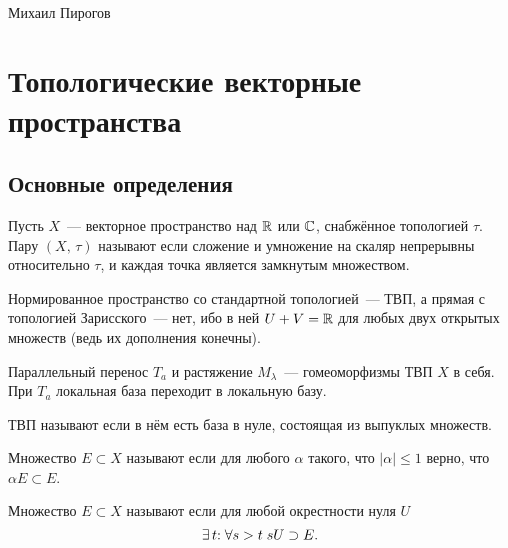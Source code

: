 \documentclass{notes}
\begin{document}
	\begin{center}
		\huge{} \\
		\vspace{0.5em}
		\large{Михаил Пирогов}
	\end{center}
	\vspace{0.5em}

\section{Топологические векторные пространства}

\subsection{Основные определения}

	\begin{de}
		Пусть $X$~--- векторное пространство над $\mathbb{R}$ или $\mathbb{C}$, снабжённое топологией $\tau$. Пару $(X, \, \tau)$ называют  если сложение и умножение на скаляр непрерывны относительно $\tau$, и каждая точка является замкнутым множеством.
	\end{de}

	\begin{exm}
		Нормированное пространство со стандартной топологией~--- ТВП, а прямая с топологией Зарисского~--- нет, ибо в ней $U + V = \mathbb{R}$ для любых двух открытых множеств (ведь их дополнения конечны).
	\end{exm}

	\begin{st}
		Параллельный перенос $T_a$ и растяжение $M_{\lambda}$~--- гомеоморфизмы ТВП $X$ в себя. При $T_a$ локальная база переходит в локальную базу.
	\end{st}

	\begin{de}
		ТВП называют  если в нём есть база в нуле, состоящая из выпуклых множеств.
	\end{de}

	\begin{de}
		Множество $E \subset X$ называют  если для любого $\alpha$ такого, что $|\alpha| \leqslant 1$ верно, что $\alpha E \subset E$.
	\end{de}

	\begin{de}
		Множество $E \subset X$ называют  если для любой окрестности нуля $U$
		\[
			\exists \, t \text{\text{:}} \; \forall s > t \; sU \supset E.
		\] 
	\end{de}
\end{document}
